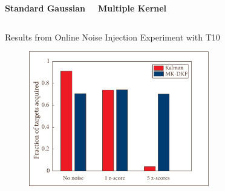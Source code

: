 \documentclass[aspectratio=169,19pt,xetex,handout]{beamer}
\begin{document}
\begin{frame}[b]{}
\Large
\begin{columns}[T] %
\column{.49\paperwidth}
\textbf{Standard Gaussian}

\column{.49\paperwidth}
\textbf{Multiple Kernel}
\end{columns}

\end{frame}


\begin{frame}{Results from Online Noise Injection Experiment with T10}
\Large
\begin{figure}
\includegraphics[width=0.7\textwidth]{kernel_results}
\end{figure}
\end{frame}
\end{document}
